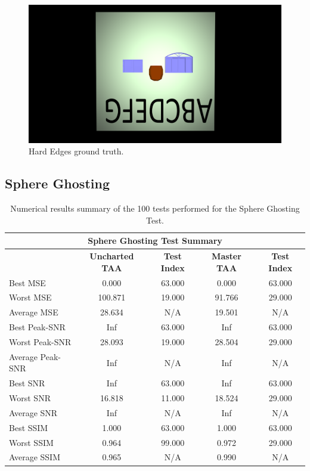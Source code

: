 \documentclass{cslthse-msc}
\begin{document}
\begin{figure}[H]
	\centering
	\includegraphics[scale=0.09]{images/results/hard_test_sobel_ground_truth.png}
	\caption{Hard Edges ground truth.}\label{fig:hard_test_truth}
\end{figure}


\subsection{Sphere Ghosting}

\begin{table}[H]
	\small
	\centering
	\caption{Numerical results summary of the 100 tests performed for the Sphere Ghosting Test.}
	\begin{tabular}{|l|c|c|c|c|}
		\hline
		\multicolumn{5}{|c|}{\textbf{Sphere Ghosting Test Summary}} \\
		\hline
		\multicolumn{1}{|c|}{\textbf{\diagbox{Tests}{AA}}} & \textbf{Uncharted TAA} & \textbf{Test Index} & \textbf{Master TAA} & \textbf{Test Index} \\
		\hline
		Best MSE & 0.000 & 63.000 & 0.000 & 63.000 \\
		\hline
		Worst MSE & 100.871 & 19.000 & 91.766 & 29.000 \\
		\hline
		Average MSE & 28.634 & N/A   & 19.501 & N/A \\
		\hline
		Best Peak-SNR & Inf   & 63.000 & Inf   & 63.000 \\
		\hline
		Worst Peak-SNR & 28.093 & 19.000 & 28.504 & 29.000 \\
		\hline
		Average Peak-SNR  & Inf   & N/A   & Inf   & N/A \\
		\hline
		Best SNR & Inf   & 63.000 & Inf   & 63.000 \\
		\hline
		Worst SNR & 16.818 & 11.000 & 18.524 & 29.000 \\
		\hline
		Average SNR  & Inf   & N/A   & Inf   & N/A \\
		\hline
		Best SSIM & 1.000 & 63.000 & 1.000 & 63.000 \\
		\hline
		Worst SSIM & 0.964 & 99.000 & 0.972 & 29.000 \\
		\hline
		Average SSIM & 0.965 & N/A   & 0.990 & N/A \\
		\hline
	\end{tabular}%
	\label{tab:sphere_ghosting}%
\end{table}%
\end{document}
